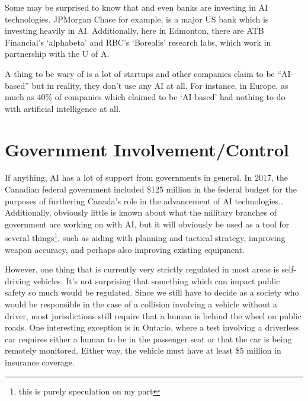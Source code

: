 \documentclass[letterpaper,12pt]{article}
\begin{document}
Some may be surprised to know that and even banks are investing in AI technologies.
JPMorgan Chase for example, is a major US bank which is investing heavily in AI.
Additionally, here in Edmonton, there are ATB Financial's `alphabeta' and RBC's
`Borealis' research labs, which work in partnership with the U of A.

A thing to be wary of is a lot of startups and other companies claim to be ``AI-based''
but in reality, they don't use any AI at all. For instance, in Europe, as much as 
40\% of companies which claimed to be `AI-based' had nothing to do
with artificial intelligence at all.
\cite{fakeaistartups}


\section{Government Involvement/Control}
If anything, AI has a lot of support from governments in general.
In 2017, the Canadian federal government included \$125 million in the
federal budget for the purposes of furthering Canada's role in the
advancement of AI technologies.\cite{canadafederalfunding}. 
Additionally, obviously little is known about what the military
branches of government are working on with AI, but it will obviously
be used as a tool for several things\footnote{this is purely speculation on my part},
such as aiding with 
planning and tactical strategy, improving weapon accuracy, and perhaps also improving
existing equipment.

However, one thing that is currently very strictly regulated
in most areas is self-driving vehicles. It's not surprising
that something which can impact public safety so much
would be regulated. Since we still have to decide as a society
who would be responsible in the case of a collision
involving a vehicle without a driver, most
jurisdictions still require that a human is behind the wheel on public roads.
One interesting exception is in Ontario, where a test involving a driverless car
requires either a human to be in the passenger seat or that the car is being
remotely monitored. Either way, the vehicle must have at least \$5 million
in insurance coverage.\cite{ontariodriverless}
\end{document}
